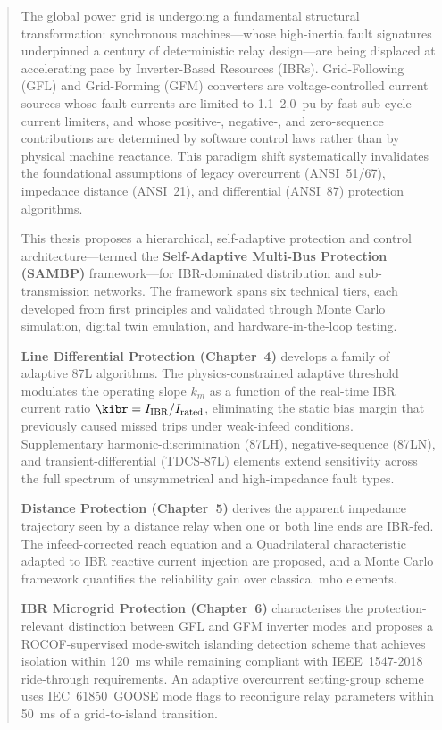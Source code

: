 \begin{abstract}

The global power grid is undergoing a fundamental structural transformation:
synchronous machines—whose high-inertia fault signatures underpinned a century
of deterministic relay design—are being displaced at accelerating pace by
Inverter-Based Resources (IBRs). Grid-Following (GFL) and Grid-Forming (GFM)
converters are voltage-controlled current sources whose fault currents are
limited to 1.1--2.0~pu by fast sub-cycle current limiters, and whose positive-,
negative-, and zero-sequence contributions are determined by software control
laws rather than by physical machine reactance. This paradigm shift
systematically invalidates the foundational assumptions of legacy overcurrent
(ANSI~51/67), impedance distance (ANSI~21), and differential (ANSI~87)
protection algorithms.

This thesis proposes a hierarchical, self-adaptive protection and control
architecture—termed the \textbf{Self-Adaptive Multi-Bus Protection (SAMBP)}
framework—for IBR-dominated distribution and sub-transmission networks.
The framework spans six technical tiers, each developed from first principles
and validated through Monte Carlo simulation, digital twin emulation, and
hardware-in-the-loop testing.

\textbf{Line Differential Protection (Chapter~4)} develops a family of adaptive
87L algorithms. The physics-constrained adaptive threshold modulates the
operating slope $k_m$ as a function of the real-time IBR current ratio
$\kibr = I_\mathrm{IBR}/I_\mathrm{rated}$, eliminating the static
bias margin that previously caused missed trips under weak-infeed conditions.
Supplementary harmonic-discrimination (87LH), negative-sequence (87LN), and
transient-differential (TDCS-87L) elements extend sensitivity across the full
spectrum of unsymmetrical and high-impedance fault types.

\textbf{Distance Protection (Chapter~5)} derives the apparent impedance
trajectory seen by a distance relay when one or both line ends are IBR-fed.
The infeed-corrected reach equation and a Quadrilateral characteristic
adapted to IBR reactive current injection are proposed, and a Monte Carlo
framework quantifies the reliability gain over classical mho elements.

\textbf{IBR Microgrid Protection (Chapter~6)} characterises the protection-relevant
distinction between GFL and GFM inverter modes and proposes a ROCOF-supervised
mode-switch islanding detection scheme that achieves isolation within 120~ms
while remaining compliant with IEEE~1547-2018 ride-through requirements.
An adaptive overcurrent setting-group scheme uses IEC~61850~GOOSE mode
flags to reconfigure relay parameters within 50~ms of a grid-to-island transition.


\end{abstract}
